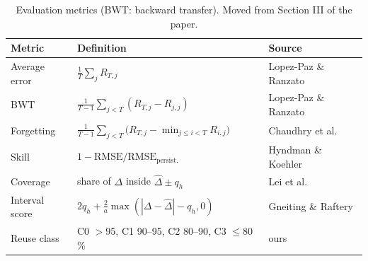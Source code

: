 \documentclass[conference]{IEEEtran}
\begin{document}
\begin{table}[t]
  \caption{Evaluation metrics (BWT: backward transfer). Moved from Section III of the paper.}
  \label{tab:metrics}
  \centering
  \footnotesize
  \setlength{\tabcolsep}{3pt}
  \begin{tabular}{@{}lll@{}}
    \toprule
    Metric & Definition & Source \\
    \midrule
    Average error & $\tfrac{1}{T}\sum_{j} R_{T,j}$ & Lopez-Paz \& Ranzato \\
    BWT & $\tfrac{1}{T-1}\sum_{j<T} (R_{T,j} - R_{j,j})$ & Lopez-Paz \& Ranzato \\
    Forgetting & $\tfrac{1}{T-1}\sum_{j<T} \big(R_{T,j} - \min_{j\le i<T} R_{i,j}\big)$ & Chaudhry et al. \\
    Skill & $1-\mathrm{RMSE}/\mathrm{RMSE}_{\mathrm{persist.}}$ & Hyndman \& Koehler \\
    Coverage & share of $\Delta$ inside $\hat\Delta\pm q_h$ & Lei et al. \\
    Interval score & $2q_h + \tfrac{2}{a}\max(|\Delta-\hat\Delta|-q_h,0)$ & Gneiting \& Raftery \\
    Reuse class & C0 $>$95, C1 90--95, C2 80--90, C3 $\le$80\,\% & ours \\
    \bottomrule
  \end{tabular}
\end{table}




\end{document}
